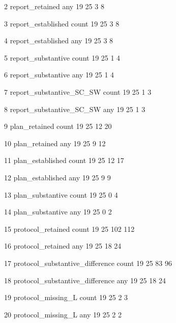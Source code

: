 \documentclass[10pt,a4paper]{article}
\begin{document}
2                  report\_\allowbreak{}retained   any      19     25           3          8\par
3               report\_\allowbreak{}established count      19     25           3          8\par
4               report\_\allowbreak{}established   any      19     25           3          8\par
5               report\_\allowbreak{}substantive count      19     25           1          4\par
6               report\_\allowbreak{}substantive   any      19     25           1          4\par
7         report\_\allowbreak{}substantive\_\allowbreak{}SC\_\allowbreak{}SW count      19     25           1          3\par
8         report\_\allowbreak{}substantive\_\allowbreak{}SC\_\allowbreak{}SW   any      19     25           1          3\par
9                    plan\_\allowbreak{}retained count      19     25          12         20\par
10                   plan\_\allowbreak{}retained   any      19     25           9         12\par
11                plan\_\allowbreak{}established count      19     25          12         17\par
12                plan\_\allowbreak{}established   any      19     25           9          9\par
13                plan\_\allowbreak{}substantive count      19     25           0          4\par
14                plan\_\allowbreak{}substantive   any      19     25           0          2\par
15               protocol\_\allowbreak{}retained count      19     25         102        112\par
16               protocol\_\allowbreak{}retained   any      19     25          18         24\par
17 protocol\_\allowbreak{}substantive\_\allowbreak{}difference count      19     25          83         96\par
18 protocol\_\allowbreak{}substantive\_\allowbreak{}difference   any      19     25          18         24\par
19              protocol\_\allowbreak{}missing\_\allowbreak{}L count      19     25           2          3\par
20              protocol\_\allowbreak{}missing\_\allowbreak{}L   any      19     25           2          2\par
\end{document}

